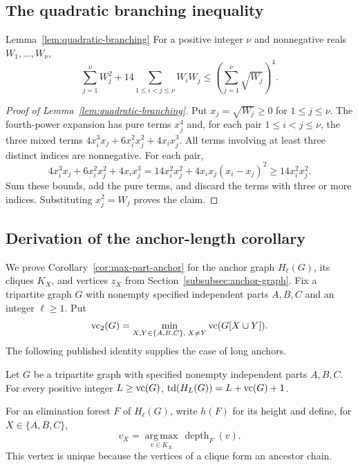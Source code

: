 \subsection{The quadratic branching inequality}
\label{app:total-depth-branching}

\begin{restatedlemma}{Lemma~\ref{lem:quadratic-branching}}
For a positive integer $\nu$ and nonnegative reals
$W_1,\ldots,W_\nu$,
\[
 \sum_{j=1}^\nu W_j^2+14\sum_{1\leq i<j\leq\nu}W_iW_j
 \leq\left(\sum_{j=1}^\nu\sqrt{W_j}\right)^4.
\]
\end{restatedlemma}

\begin{proof}[Proof of Lemma~\ref{lem:quadratic-branching}]
Put $x_j=\sqrt{W_j}\geq0$ for $1\leq j\leq\nu$. The fourth-power
expansion has pure terms $x_j^4$ and, for each pair $1\leq i<j\leq\nu$, the three mixed terms
$4x_i^3x_j+6x_i^2x_j^2+4x_ix_j^3$. All terms involving at least
three distinct indices are nonnegative. For each pair,
\[
4x_i^3x_j+6x_i^2x_j^2+4x_ix_j^3
 =14x_i^2x_j^2+4x_ix_j(x_i-x_j)^2
 \geq14x_i^2x_j^2.
\]
Sum these bounds, add the pure terms, and discard the terms with
three or more indices. Substituting $x_j^2=W_j$ proves the claim.
\end{proof}

\subsection{Derivation of the anchor-length corollary}
\label{app:anchor-proof}

We prove Corollary~\ref{cor:max-part-anchor} for the anchor graph
$H_\ell(G)$, its cliques $K_X$, and vertices $z_X$ from
Section~\ref{subsubsec:anchor-graph}. Fix a tripartite graph $G$ with
nonempty specified independent parts $A,B,C$ and an integer $\ell\ge1$.
Put
\[
 \operatorname{vc}_2(G)=\min_{X,Y\in\{A,B,C\},\;X\ne Y}\operatorname{vc}(G[X\cup Y]).
\]
The following published identity supplies the case of long anchors.

\begin{lemma}
\label{lem:bns-anchor}
Let $G$ be a tripartite graph with specified nonempty independent parts
$A,B,C$. For every positive integer $L\ge\operatorname{vc}(G)$,
$\operatorname{td}(H_L(G))=L+\operatorname{vc}(G)+1$.
\end{lemma}

For an elimination forest $F$ of $H_\ell(G)$, write $h(F)$ for its
height and define, for $X\in\{A,B,C\}$,
\[
 v_X=\underset{v\in K_X}{\operatorname{arg\,max}}\,
                   \operatorname{depth}_F(v).
\]
This vertex is unique because the vertices of a clique form an
ancestor chain.


